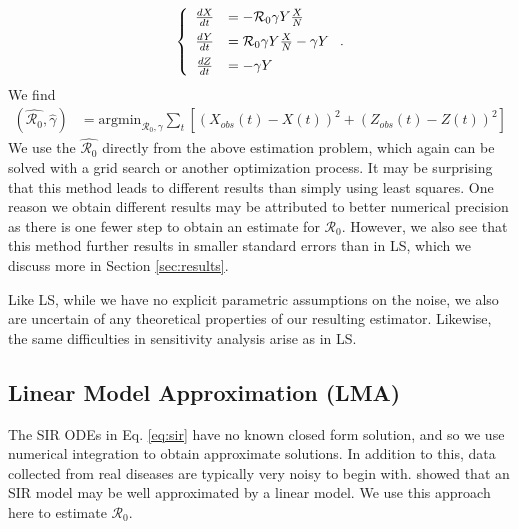 \documentclass[12pt]{article}
\newcommand{\rr}{\ensuremath{\mathcal{R}_0}}
\begin{document}
\begin{align*}
  \left \{
  \begin{array}{cl}
    \frac{dX}{dt} &= - \rr \gamma Y \frac{X}{N}\vspace{.5em}\\
    \frac{dY}{dt} &=  \rr \gamma Y \frac{X}{N}  - \gamma Y\vspace{.5em} \\
    \frac{dZ}{dt} &=  - \gamma Y 
  \end{array}
  \right . .
  \end{align*}
We find
\begin{align*}
(\hat{\rr}, \hat{\gamma} ) &= \text{argmin}_{\rr, \gamma} \sum_{t} \left [ \left (X_{obs}(t) - X(t)\right )^2 + \left ( Z_{obs}(t) - Z(t) \right )^2 \right ]
\end{align*}
We use the $\hat{\rr}$ directly from the above estimation problem, which again can be solved with a grid search or another optimization process.  It may be surprising that this method leads to different results than simply using least squares.  One reason we obtain different results may be attributed to better numerical precision as there is one fewer step to obtain an estimate for $\rr$.  However, we also see that this method further results in smaller standard errors than in LS, which we discuss more in Section \ref{sec:results}.

Like LS, while we have no explicit parametric assumptions on the noise, we also are uncertain of any theoretical properties of our resulting estimator.  Likewise, the same difficulties in sensitivity analysis arise as in LS.



\subsection{Linear Model Approximation (LMA)}\label{linear-model-approximation-degree-10}

The SIR ODEs in Eq. \ref{eq:sir} have no known closed form solution, and so we use numerical integration to obtain approximate solutions.  In addition to this, data collected from real diseases are typically very noisy to begin with.  \cite{chang2017} showed that an SIR model may be well approximated by a linear model.  We use this approach here to estimate $\rr$.
\end{document}
